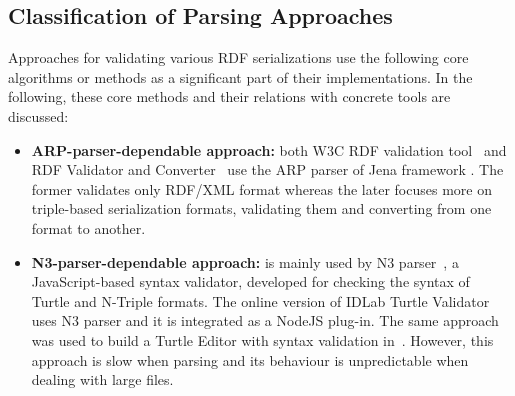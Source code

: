 \subsection{Classification of Parsing Approaches}

Approaches for validating various RDF serializations use the following core algorithms or methods as a significant part of their implementations. 
In the following, these core methods and their relations with concrete tools are discussed: 

\begin{itemize}[noitemsep] 

\item \textbf{ARP-parser-dependable approach:} both W3C RDF validation tool~\cite{W3C:Validation:Online} and RDF Validator and Converter~\cite{Mybluemix:Validation:Online} use the ARP parser of Jena framework \cite{McBride:2002:JSW:613357.613755}. 
The former validates only RDF/XML format whereas the later focuses more on triple-based serialization formats, validating them and converting from one format to another. 

\item \textbf{N3-parser-dependable approach:} is mainly used by N3 parser~\cite{N3Parser:Online}, a JavaScript-based syntax validator, developed for checking the syntax of Turtle and N-Triple formats. 
The online version of IDLab Turtle Validator \cite{IDLab:Validation:Online} uses N3 parser and it is integrated as a NodeJS plug-in. 
The same approach was used to build a Turtle Editor with syntax validation in~\cite{petersenturtleeditor}. 
However, this approach is slow when parsing and its behaviour is unpredictable when dealing with large files. 


\end{itemize}
